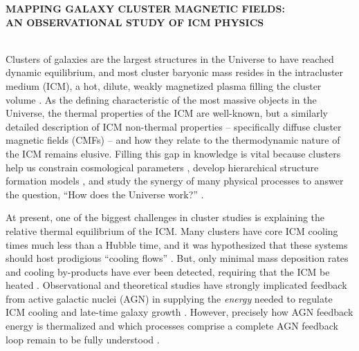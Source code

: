 \documentclass[letterpaper,12pt]{article}
\begin{document}
\begin{center}
  {\bf\uppercase{mapping galaxy cluster magnetic fields:\\an
      observational study of icm physics}}
\end{center}

\\
\indent Clusters of galaxies are the largest structures in the
Universe to have reached dynamic equilibrium, and most cluster
baryonic mass resides in the intracluster medium (ICM), a hot, dilute,
weakly magnetized plasma filling the cluster volume
\citep{sarazinbook}. As the defining characteristic of the most
massive objects in the Universe, the thermal properties of the ICM are
well-known, but a similarly detailed description of ICM non-thermal
properties -- specifically diffuse cluster magnetic fields (CMFs) --
and how they relate to the thermodynamic nature of the ICM remains
elusive. Filling this gap in knowledge is vital because clusters help
us constrain cosmological parameters \citep{voitreview}, develop
hierarchical structure formation models \citep{1995MNRAS.275...56N},
and study the synergy of many physical processes to answer the
question, ``How does the Universe work?''
\citep{2004cgpc.conf.....M}.

At present, one of the biggest challenges in cluster studies is
explaining the relative thermal equilibrium of the ICM. Many clusters
have core ICM cooling times much less than a Hubble time, and it was
hypothesized that these systems should host prodigious ``cooling
flows'' \citep{fabiancfreview}. But, only minimal mass deposition
rates and cooling by-products have ever been detected, requiring that
the ICM be heated \citep{cfreview}. Observational and theoretical
studies have strongly implicated feedback from active galactic nuclei
(AGN) in supplying the {\it{energy}} needed to regulate ICM cooling
and late-time galaxy growth \citep{mcnamrev}. However, precisely how
AGN feedback energy is thermalized and which processes comprise a
complete AGN feedback loop remain to be fully understood
\citep{2010ApJ...710..743D}.
\end{document}
